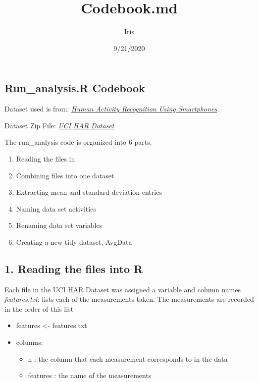 \documentclass[
]{article}
\title{Codebook.md}
\author{Iris}
\date{9/21/2020}
\providecommand{\tightlist}{%
  \setlength{\itemsep}{0pt}\setlength{\parskip}{0pt}}
\begin{document}
\maketitle

\hypertarget{run_analysis.r-codebook}{%
\subsection{Run\_analysis.R Codebook}\label{run_analysis.r-codebook}}

Dataset used is from:
\emph{\href{http://archive.ics.uci.edu/ml/datasets/Human+Activity+Recognition+Using+Smartphones}{Human
Activity Recognition Using Smartphones}}.

Dataset Zip File:
\emph{\href{https://d396qusza40orc.cloudfront.net/getdata\%2Fprojectfiles\%2FUCI\%20HAR\%20Dataset.zip}{UCI
HAR Dataset}}

The run\_analysis code is organized into 6 parts.

\begin{enumerate}
\def\labelenumi{\arabic{enumi}.}
\tightlist
\item
  Reading the files in
\item
  Combining files into one dataset
\item
  Extracting mean and standard deviation entries
\item
  Naming data set activities
\item
  Renaming data set variables
\item
  Creating a new tidy dataset, AvgData
\end{enumerate}

\hypertarget{reading-the-files-into-r}{%
\subsection{1. Reading the files into
R}\label{reading-the-files-into-r}}

Each file in the UCI HAR Dataset was assigned a variable and column
names \emph{features.txt}: lists each of the measurements taken. The
measurements are recorded in the order of this list

\begin{itemize}
\tightlist
\item
  features \textless- features.txt\\
\item
  columns:

  \begin{itemize}
  \tightlist
  \item
    n : the column that each measurement corresponds to in the data\\
  \item
    features : the name of the measurements
  \end{itemize}
\end{itemize}
\end{document}
